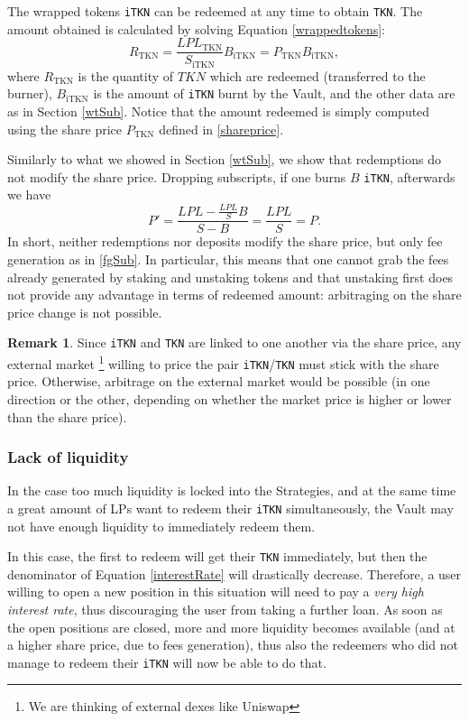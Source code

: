 \documentclass[a4paper,10 pt]{article}
\theoremstyle{definition}
\newtheorem{remark}{Remark}
\begin{document}
The wrapped tokens \verb|iTKN| can be redeemed at any time to obtain \verb|TKN|. The amount obtained is calculated by solving Equation \eqref{wrappedtokens}:
\begin{equation}\label{redemptions}
R_{\text{TKN}} = \frac{LPL_{\text{TKN}}}{S_{\text{iTKN}}}B_{\text{iTKN}} = P_{\text{TKN}} B_{\text{iTKN}},
\end{equation}
where $R_{\text{TKN}}$ is the quantity of $TKN$ which are redeemed (transferred to the burner), $B_{\text{iTKN}}$ is the amount of \verb|iTKN| burnt by the Vault, and the other data are as in Section \ref{wtSub}. Notice that the amount redeemed is simply computed using the share price $P_{\text{TKN}}$ defined in \eqref{shareprice}.

Similarly to what we showed in Section \ref{wtSub}, we show that redemptions do not modify the share price. Dropping subscripts, if one burns $B$ \verb|iTKN|, afterwards we have 
$$P' = \frac{LPL - \frac{LPL}{S}B}{S - B} = \frac{LPL}{S} = P.$$
In short, neither redemptions nor deposits modify the share price, but only fee generation as in \ref{fgSub}. In particular, this means that one cannot grab the fees already generated by staking and unstaking tokens and that unstaking first does not provide any advantage in terms of redeemed amount: arbitraging on the share price change is not possible.

\begin{remark}
Since \verb|iTKN| and \verb|TKN| are linked to one another via the share price, any external market \footnote{We are thinking of external dexes like Uniswap} willing to price the pair \verb|iTKN|/\verb|TKN| must stick with the share price. Otherwise, arbitrage on the external market would be possible (in one direction or the other, depending on whether the market price is higher or lower than the share price).
\end{remark}

\subsubsection{Lack of liquidity}\label{lackSubSub}
In the case too much liquidity is locked into the Strategies, and at the same time a great amount of LPs want to redeem their \verb|iTKN| simultaneously, the Vault may not have enough liquidity to immediately redeem them.

In this case, the first to redeem will get their \verb|TKN| immediately, but then the denominator of Equation \eqref{interestRate} will drastically decrease. Therefore, a user willing to open a new position in this situation will need to pay a {\it very high interest rate}, thus discouraging the user from taking a further loan. As soon as the open positions are closed, more and more liquidity becomes available (and at a higher share price, due to fees generation), thus also the redeemers who did not manage to redeem their \verb|iTKN| will now be able to do that.
\end{document}
